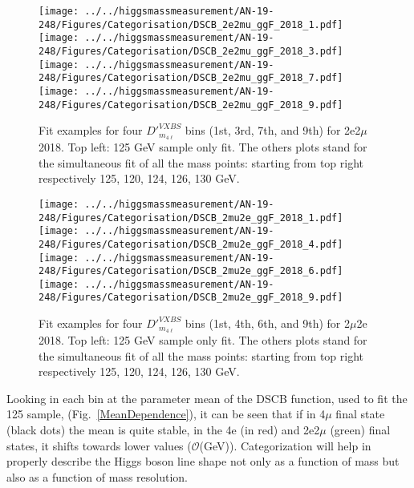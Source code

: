 \begin{figure}[!htbp]
\begin{center}
	\texttt{[image: ../../higgsmassmeasurement/AN-19-248/Figures/Categorisation/DSCB\_2e2mu\_ggF\_2018\_1.pdf]}
	\texttt{[image: ../../higgsmassmeasurement/AN-19-248/Figures/Categorisation/DSCB\_2e2mu\_ggF\_2018\_3.pdf]}
	\texttt{[image: ../../higgsmassmeasurement/AN-19-248/Figures/Categorisation/DSCB\_2e2mu\_ggF\_2018\_7.pdf]}
	\texttt{[image: ../../higgsmassmeasurement/AN-19-248/Figures/Categorisation/DSCB\_2e2mu\_ggF\_2018\_9.pdf]}
\caption{
Fit examples for four $D'^{VXBS}_{m_{4\ell}}$ bins (1st, 3rd, 7th, and 9th) 
for 2e2$\mu$ 2018. Top left: 125 GeV sample only fit. The others plots stand for the simultaneous 
fit of all the mass points: starting from top right respectively 125, 120, 124, 126, 130 GeV.}
\label{signal_lineshape_2018_2e2mu}
\end{center}
\end{figure}

\begin{figure}[!htbp]
\begin{center}
	\texttt{[image: ../../higgsmassmeasurement/AN-19-248/Figures/Categorisation/DSCB\_2mu2e\_ggF\_2018\_1.pdf]}
	\texttt{[image: ../../higgsmassmeasurement/AN-19-248/Figures/Categorisation/DSCB\_2mu2e\_ggF\_2018\_4.pdf]}
	\texttt{[image: ../../higgsmassmeasurement/AN-19-248/Figures/Categorisation/DSCB\_2mu2e\_ggF\_2018\_6.pdf]}
	\texttt{[image: ../../higgsmassmeasurement/AN-19-248/Figures/Categorisation/DSCB\_2mu2e\_ggF\_2018\_9.pdf]}
\caption{
Fit examples for four $D'^{VXBS}_{m_{4\ell}}$ bins (1st, 4th, 6th, and 9th) 
for 2$\mu$2e 2018. Top left: 125 GeV sample only fit. The others plots stand for the simultaneous 
fit of all the mass points: starting from top right respectively 125, 120, 124, 126, 130 GeV.}
\label{signal_lineshape_2018_2mu2e}
\end{center}
\end{figure}
Looking in each bin at the parameter mean of the DSCB function, used to fit the 125 \GeV sample, 
(Fig.~\ref{MeanDependence}), it can be seen that if in 4$\mu$ final state (black dots) the mean
is quite stable, in the 4e (in red) and 2e2$\mu$ (green) final states, it shifts towards lower values
($\mathcal{O}$({GeV})). Categorization will help in properly describe the Higgs boson line shape
not only as a function of mass but also as a function of mass resolution.

